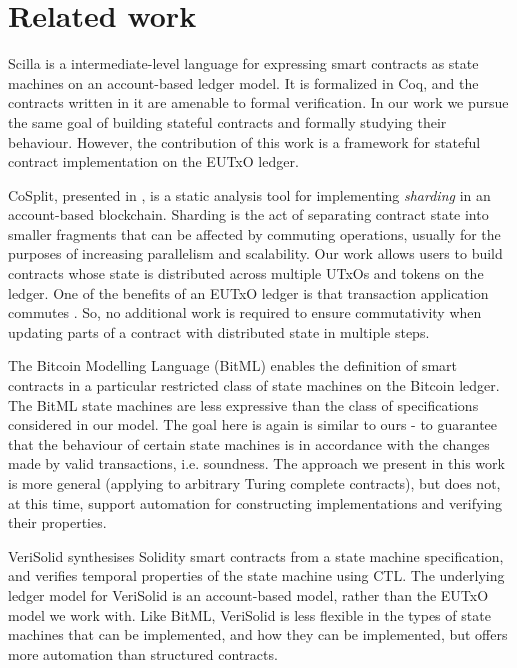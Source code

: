 \section{Related work}
\label{sec:related}



Scilla \cite{scilla} is a intermediate-level language for expressing smart contracts as state
machines on an account-based ledger model. It is formalized in Coq, and the
contracts written in it are amenable to formal verification. In our work
we pursue the same goal of building stateful contracts and formally studying
their behaviour. However, the contribution of this work is a framework for stateful
contract implementation on the EUTxO ledger.

CoSplit, presented in \cite{sharding}, is a static analysis tool for implementing
\emph{sharding} in an account-based blockchain. Sharding is the act of
separating contract state into smaller
fragments that can be affected by commuting operations, usually for the purposes of
increasing parallelism and scalability.
Our work allows users to build contracts whose state is distributed across multiple
UTxOs and tokens on the ledger. One of the benefits of an EUTxO ledger is that
transaction application commutes \cite{parallelism}. So, no additional work is
required to ensure commutativity when updating parts of a contract with
distributed state in multiple steps.

The Bitcoin Modelling Language (BitML) \cite{bitml} enables the definition of smart
contracts in a particular restricted class of state machines on the Bitcoin ledger.
The BitML state machines are less expressive than the class of specifications
considered in our model. The goal here is again is similar to
ours - to guarantee that the behaviour of certain state machines is in accordance
with the changes made by valid transactions, i.e. soundness. The approach
we present in this work is more general (applying to arbitrary Turing complete
contracts), but does not, at this time, support automation for
constructing implementations and verifying their properties.

VeriSolid \cite{verisolid} synthesises Solidity smart contracts from a state
machine specification, and
verifies temporal properties of the state machine using CTL. The underlying
ledger model for VeriSolid is an account-based model, rather than the
EUTxO model we work with. Like BitML, VeriSolid is less flexible in the types of
state machines that can be implemented, and how they can be implemented, but
offers more automation than structured contracts.

